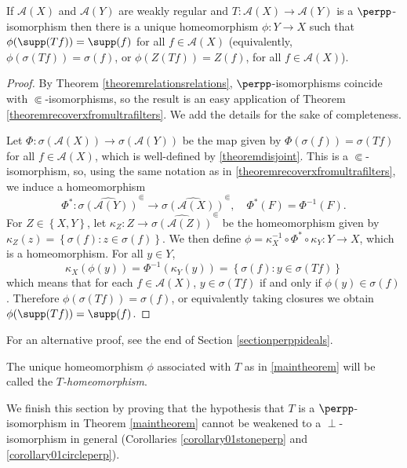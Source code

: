 \begin{theorem}\label{maintheorem}
If $\mathcal{A}(X)$ and $\mathcal{A}(Y)$ are weakly regular and $T:\mathcal{A}(X)\to\mathcal{A}(Y)$ is a $\perpp$-isomorphism then there is a unique homeomorphism $\phi:Y\to X$ such that $\phi(\supp(Tf))=\supp(f)$ for all $f\in \mathcal{A}(X)$ (equivalently, $\phi(\sigma(Tf))=\sigma(f)$, or $\phi(Z(Tf))=Z(f)$, for all $f\in\mathcal{A}(X)$).
\end{theorem}
\begin{proof}
By Theorem \ref{theoremrelationsrelations}, $\perpp$-isomorphisms coincide with $\Subset$-isomorphisms, so the result is an easy application of Theorem \ref{theoremrecoverxfromultrafilters}. We add the details for the sake of completeness.

Let $\Phi:\sigma(\mathcal{A}(X))\to\sigma(\mathcal{A}(Y))$ be the map given by $\Phi(\sigma(f))=\sigma(Tf)$ for all $f\in\mathcal{A}(X)$, which is well-defined by \ref{theoremdisjoint}. This is a $\Subset$-isomorphism, so, using the same notation as in \ref{theoremrecoverxfromultrafilters}, we induce a homeomorphism
\[\Phi^*:\widehat{\sigma(\mathcal{A}(Y))}^{\Subset}\to\widehat{\sigma(\mathcal{A}(X))}^{\Subset},\quad\Phi^*(F)=\Phi^{-1}(F).\]
For $Z\in\left\{X,Y\right\}$, let $\kappa_Z:Z\to\widehat{\sigma(\mathcal{A}(Z))}^{\Subset}$ be the homeomorphism given by
$\kappa_Z(z)=\left\{\sigma(f):z\in\sigma(f)\right\}$. We then define $\phi=\kappa_X^{-1}\circ\Phi^*\circ\kappa_Y:Y\to X$, which is a homeomorphism. For all $y\in Y$,
\[\kappa_X(\phi(y))=\Phi^{-1}(\kappa_Y(y))=\left\{\sigma(f):y\in\sigma(Tf)\right\}\]
which means that for each $f\in\mathcal{A}(X)$, $y\in\sigma(Tf)$ if and only if $\phi(y)\in\sigma(f)$. Therefore $\phi(\sigma(Tf))=\sigma(f)$, or equivalently taking closures we obtain $\phi(\supp(Tf))=\supp(f)$.\qedhere
\end{proof}

For an alternative proof, see the end of Section \ref{sectionperppideals}.

\begin{definition}\label{definitionthomeomorphism}
The unique homeomorphism $\phi$ associated with $T$ as in \ref{maintheorem} will be called the \emph{$T$-homeomorphism}.
\end{definition}

We finish this section by proving that the hypothesis that $T$ is a $\perpp$-isomorphism in Theorem \ref{maintheorem} cannot be weakened to a $\perp$-isomorphism in general (Corollaries \ref{corollary01stoneperp} and \ref{corollary01circleperp}).

